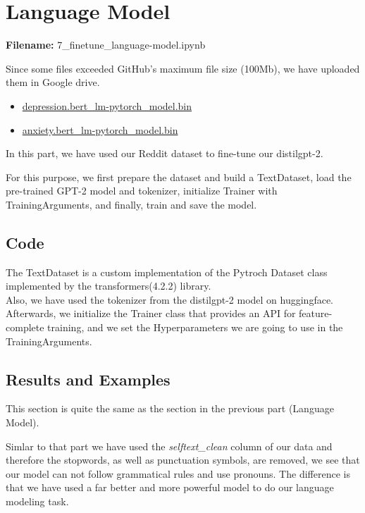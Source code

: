 \documentclass[12pt, a4paper]{article}
\begin{document}
	
	\section{Language Model}
	\large{\textbf{Filename:} 7\_finetune\_language-model.ipynb}
	
	Since some files exceeded GitHub's maximum file size (100Mb), we have uploaded them in Google drive. 
	\begin{itemize}
		\item \href{https://drive.google.com/file/d/1AmbAl9mFoGG9mITTTz7TRgPEwVUAiN9U/view?usp=sharing}{depression.bert\_lm-pytorch\_model.bin}
		\item
		\href{https://drive.google.com/file/d/19-KhVSsBFo7WpfzeXNKDpUnYKv5xfDkY/view?usp=sharing}{anxiety.bert\_lm-pytorch\_model.bin}
	\end{itemize}
	
	\vspace{5mm}
	In this part, we have used our Reddit dataset to fine-tune our distilgpt-2.
	
	For this purpose, we first prepare the dataset and build a TextDataset, load the pre-trained GPT-2 model and tokenizer, initialize Trainer with TrainingArguments, and finally, train and save the model. 
	
	\subsection{Code}
	The TextDataset is a custom implementation of the Pytroch Dataset class implemented by the transformers(4.2.2) library.
	\\Also, we have used the tokenizer from the distilgpt-2 model on huggingface.
	\\Afterwards, we initialize the Trainer class that provides an API for feature-complete training, and we set the Hyperparameters we are going to use in the TrainingArguments.
	
	\subsection{Results and Examples}
	This section is quite the same as the section in the previous part (Language Model). 
	
	Simlar to that part we have used the \emph{selftext\_clean} column of our data and therefore the stopwords, as well as punctuation symbols, are removed, we see that our model can not follow grammatical rules and use pronouns. The difference is that we have used a far better and more powerful model to do our language modeling task.
	
\end{document}
